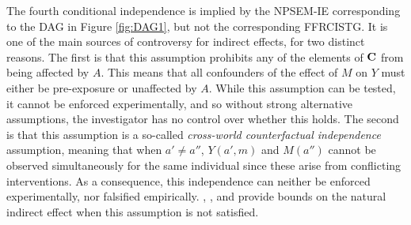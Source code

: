 \documentclass[12pt]{article}
\newtheorem{assumption}{Assumption}
\def\ci{\mbox{\ensuremath{\perp\!\!\!\perp}}}
\begin{document}
The fourth conditional independence is implied by the NPSEM-IE corresponding to the DAG in Figure \ref{fig:DAG1}, but not the corresponding FFRCISTG. It is one of the main sources of controversy for indirect effects, for two distinct reasons. The first is that this assumption prohibits any of the elements of ${\bf C}$ from being affected by $A$. This means that all confounders of the effect of $M$ on $Y$ must either be pre-exposure or unaffected by $A$. While this assumption can be tested, it cannot be enforced experimentally, and so without strong alternative assumptions, the investigator has no control over whether this holds. The second is that this assumption is a so-called \emph{cross-world counterfactual independence} assumption, meaning that when $a'\neq a''$, $Y(a',m)$ and $M(a'')$ cannot be observed simultaneously for the same individual since these arise from conflicting interventions. As a consequence, this independence can neither be enforced experimentally, nor falsified empirically. \cite{robins2010alternative}, \cite{tchetgen2014bounds}, and \cite{miles2017partial} provide bounds on the natural indirect effect when this assumption is not satisfied. 
\begin{comment}
The exchangeability assumptions are satisfied under the nonparametric structural equation model with independent errors (NPSEM-IE) corresponding to the directed acyclic graph (DAG) in Figure \ref{fig:DAG1}. 
In particular, the corresponding NPSEM-IE is
\[{\bf C} = {\bf f_C}(\varepsilon_C);
A = f_A({\bf C}, \varepsilon_A);
M = f_M({\bf C}, A, \varepsilon_M);
Y = f_Y({\bf C}, A, M, \varepsilon_Y),\]
where $\varepsilon_C$, $\varepsilon_A$, $\varepsilon_M$, $\varepsilon_Y$ are all mutually independent. The independence of the $\varepsilon_M$ and $\varepsilon_Y$ error terms is what implies the cross-world counterfactual independence in Assumption \ref{assn:NPSEM}. \cite{robins2010alternative} discuss alternative models with weaker assumptions to the NPSEM-IE corresponding to DAGs such as the one in Figure \ref{fig:DAG1}. In particular, they discuss the finest fully randomized causally interpretable structured tree graph (FFRCISTG), which implies exchangeability Assumptions \ref{assn:NUCA-AY}--\ref{assn:NUCA-AM} but not Assumption \ref{assn:NPSEM}. Instead, the FFRCISTG implies a weaker version of Assumption \ref{assn:NPSEM} that does not include cross-world counterfactual independencies.
\begin{assumption}%
    \label{assn:FFRCISTG}
     $Y(a',m)\ci M(a')\mid {\bf C}$ for all $a'$ and $m$.
\end{assumption}
\end{comment}
\end{document}
